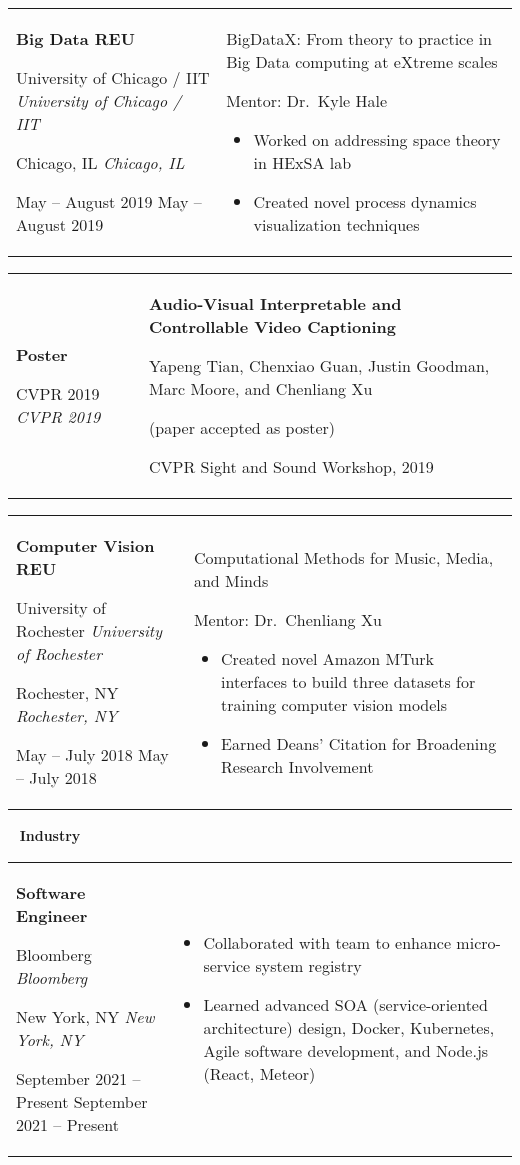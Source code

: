 \documentclass[11pt,letterpaper]{article}
\newcommand{\sect}[1]{
\begin{center}
	\noindent\xrfill[0.7ex]{0.5pt} \mbox{ } {\Large \bf #1} \mbox{ } \xrfill[0.7ex]{0.5pt}
\end{center}
}
\newcommand{\entry}[5]{
	\noindent
	\begin{tabular}{p{2in} p{\dimexpr \linewidth-2\tabcolsep-2.25in}} %
		\noindent \textbf{#1}
		
		\ifx #2  \else \noindent \textit{#2} \fi
		
		\ifx #3  \else \noindent \textit{#3} \fi
		
		\ifx #4  \else \noindent #4 \fi
		&
		#5
	\end{tabular}
	\vspace{0.5cm}
}
\begin{document}
	
	\entry{Big Data REU}{University of Chicago / IIT}{Chicago, IL}{May -- August 2019}{
		BigDataX: From theory to practice in Big Data computing at eXtreme scales
		
		Mentor: Dr.\ Kyle Hale

		\begin{itemize}[itemsep=0pt, nosep, wide]
			\item Worked on addressing space theory in HExSA lab
			\item Created novel process dynamics visualization techniques
		\end{itemize}
	}
	
	
	\entry{Poster}{CVPR 2019}{}{}{
		\textbf{Audio-Visual Interpretable and Controllable Video Captioning}
		
		Yapeng Tian, Chenxiao Guan, Justin Goodman, Marc Moore, and Chenliang Xu
		
		(paper accepted as poster)
		
		CVPR Sight and Sound Workshop, 2019
	}
	
	\entry{Computer Vision REU}{University of Rochester}{Rochester, NY}{May -- July 2018}{
		Computational Methods for Music, Media, and Minds
		
		Mentor: Dr.\ Chenliang Xu
		
		\begin{itemize}[nosep, wide]
			\item Created novel Amazon MTurk interfaces to build three datasets for training computer vision models
			\item Earned Deans' Citation for Broadening Research Involvement
		\end{itemize}
	}
	
	\pagebreak
	\sect{Industry}
	
	\entry{Software Engineer}{Bloomberg}{New York, NY}{September 2021 -- Present}{
		\vspace{-5mm}
		\begin{itemize}[itemsep=0pt, wide]
			\item Collaborated with team to enhance micro-service system registry
			\item Learned advanced SOA (service-oriented architecture) design, Docker, Kubernetes, Agile software development, and Node.js (React, Meteor)
		\end{itemize}
	}
	
\end{document}
